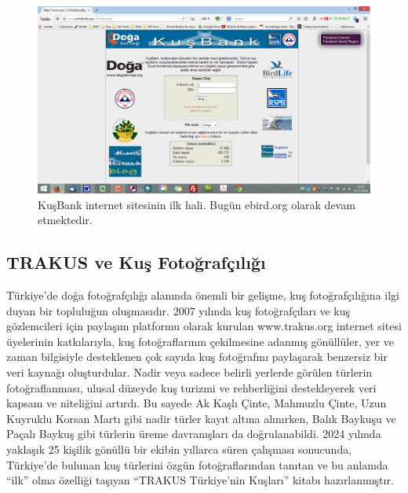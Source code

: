 \documentclass[
  a4paper,
  DIV=11,
  numbers=noendperiod]{scrreprt}
\begin{document}
\begin{figure}[H]

{\centering \includegraphics[width=6.25in,height=\textheight]{images/kusbank.png}

}

\caption{KuşBank internet sitesinin ilk hali. Bugün ebird.org olarak
devam etmektedir.}

\end{figure}%

\subsection*{TRAKUS ve Kuş
Fotoğrafçılığı}\label{trakus-ve-kuux15f-fotoux11frafuxe7ux131lux131ux11fux131}

Türkiye'de doğa fotoğrafçılığı alanında önemli bir gelişme, kuş
fotoğrafçılığına ilgi duyan bir topluluğun oluşmasıdır. 2007 yılında kuş
fotoğrafçıları ve kuş gözlemcileri için paylaşım platformu olarak
kurulan www.trakus.org internet sitesi üyelerinin katkılarıyla, kuş
fotoğraflarının çekilmesine adanmış gönüllüler, yer ve zaman bilgisiyle
desteklenen çok sayıda kuş fotoğrafını paylaşarak benzersiz bir veri
kaynağı oluşturdular. Nadir veya sadece belirli yerlerde görülen
türlerin fotoğraflanması, ulusal düzeyde kuş turizmi ve rehberliğini
destekleyerek veri kapsam ve niteliğini artırdı. Bu sayede Ak Kaşlı
Çinte, Mahmuzlu Çinte, Uzun Kuyruklu Korsan Martı gibi nadir türler
kayıt altına alınırken, Balık Baykuşu ve Paçalı Baykuş gibi türlerin
üreme davranışları da doğrulanabildi. 2024 yılında yaklaşık 25 kişilik
gönüllü bir ekibin yıllarca süren çalışması sonucunda, Türkiye'de
bulunan kuş türlerini özgün fotoğraflarından tanıtan ve bu anlamda
``ilk'' olma özelliği taşıyan ``TRAKUS Türkiye'nin Kuşları'' kitabı
hazırlanmıştır.
\end{document}
